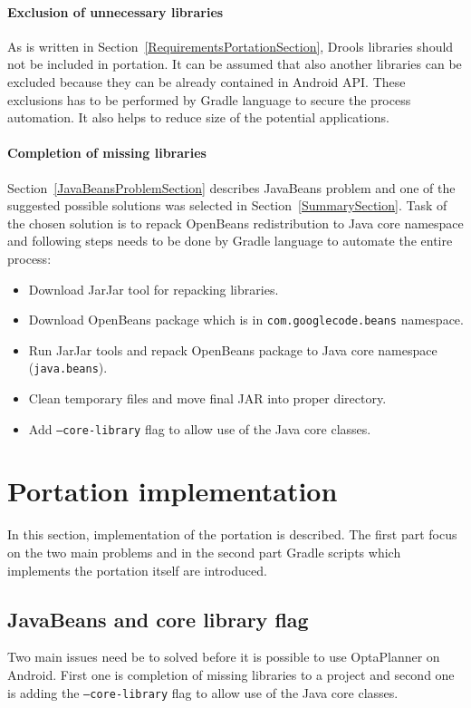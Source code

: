 \paragraph{Exclusion of unnecessary libraries}
As is written in Section~\ref{RequirementsPortationSection}, Drools libraries should not be included in portation. It
can be assumed that also another libraries can be excluded because they can be already contained in Android API. These
exclusions has to be performed by Gradle language to secure the process automation. It also helps to reduce size of the
potential applications.

\paragraph{Completion of missing libraries}
Section~\ref{JavaBeansProblemSection} describes JavaBeans problem and one of the suggested possible solutions was
selected in Section~\ref{SummarySection}. Task of the chosen solution is to repack OpenBeans redistribution to Java core
namespace and following steps needs to be done by Gradle language to automate the entire process:
\begin{itemize}
\item Download JarJar tool for repacking libraries.
\item Download OpenBeans package which is in \texttt{com.googlecode.beans} namespace.
\item Run JarJar tools and repack OpenBeans package to Java core namespace (\texttt{java.beans}).
\item Clean temporary files and move final JAR into proper directory.
\item Add \texttt{--core-library} flag to allow use of the Java core classes.
\end{itemize}

\section{Portation implementation}\label{PortationImplSection}
In this section, implementation of the portation is described. The first part focus on the two main problems and in the
second part Gradle scripts which implements the portation itself are introduced.

\subsection{JavaBeans and core library flag}\label{coreLib}
Two main issues need be to solved before it is possible to use OptaPlanner on Android. First one is completion of
missing libraries to a project and second one is adding the \texttt{--core-library} flag to allow use of the Java core
classes.

